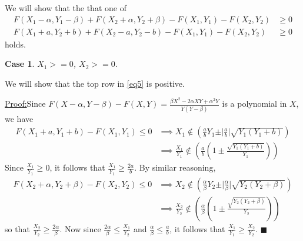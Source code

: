 \documentclass{article}
\theoremstyle{case}
\newtheorem{case}{Case}
\newenvironment{claim}[1]{\par\noindent\underline{Claim:}\space#1}{}
\newenvironment{claimproof}[1]{\par\noindent\underline{Proof:}\space#1}{\hfill $\blacksquare$}
\begin{document}
We will show that the that one of
\begin{align} \label{eq5}
F(X_1 - \alpha, Y_1 - \beta) + F(X_2 + \alpha, Y_2 + \beta) - F(X_1, Y_1) - F(X_2, Y_2) & \geq 0 \\
F(X_1 + a, Y_2 +b) + F(X_2 - a, Y_2 - b) - F(X_1, Y_1) - F(X_2, Y_2) & \geq 0
\end{align}
holds.


\begin{case} 
$X_1 >= 0$, $X_2 >= 0$. 
\end{case}
We will show that the top row in \ref{eq5} is positive.

\vspace{12pt}

\begin{claimproof}
Since $F(X - \alpha, Y - \beta) - F(X, Y) = \frac{\beta X^2 - 2\alpha XY + \alpha^2 Y}{Y\left( Y-\beta\right)}$ is a polynomial in $X$, we have
\begin{align*}
F(X_1+a, Y_1+b) - F(X_1,Y_1) \leq 0 & \implies X_1 \not \in \left( \frac{a}{b}Y_1 \pm \vert \frac{a}{b} \vert \sqrt{Y_1\left( Y_1+b\right) } \right) \\
& \implies \frac{X_1}{Y_1} \not \in \left( \frac{a}{b} \left( 1 \pm \frac{\sqrt{Y_1\left( Y_1+b\right) }}{Y_1}\right) \right)
\end{align*}
Since $\frac{X_1}{Y_1} \geq 0$, it follows that $\frac{X_1}{Y_1} \geq \frac{2a}{b}$. By similar reasoning, 
\begin{align*}
F(X_2+\alpha, Y_2+\beta) - F(X_2,Y_2) \leq 0 & \implies X_2 \not \in \left( \frac{\alpha}{\beta}Y_2 \pm \vert \frac{\alpha}{\beta} \vert \sqrt{Y_2\left( Y_2+\beta \right) } \right) \\
& \implies \frac{X_2}{Y_2} \not \in \left( \frac{\alpha}{\beta} \left( 1 \pm \frac{\sqrt{Y_2\left( Y_2+\beta \right) }}{Y_2}\right) \right)
\end{align*}
so that $\frac{X_2}{Y_2} \geq \frac{2\alpha}{\beta}$. Now since $\frac{2\alpha}{\beta} \leq \frac{X_1}{Y_2}$ and $\frac{\alpha}{\beta} \leq \frac{a}{b}$, it follows that $\frac{X_1}{Y_1} \geq \frac{X_2}{Y_2}$.
\end{claimproof}
\end{document}
